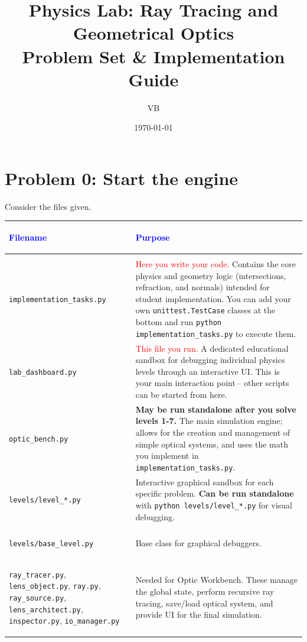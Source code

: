 \documentclass[11pt]{article}
\title{Physics Lab: Ray Tracing and Geometrical Optics \\ \large Problem Set \& Implementation Guide}
\author{VB}
\date{\today}
\begin{document}
\maketitle

\section*{Problem 0: Start the engine}

Consider the files given.
\begin{center}
\renewcommand{\arraystretch}{1.5}
\begin{tabularx}{\textwidth}{@{} >{\bfseries\raggedright\arraybackslash}p{5.5cm} X @{}}
\toprule
\textcolor{blue}{Filename} & \textcolor{blue}{Purpose} \\ \midrule
\multicolumn{2}{@{}l}{\textbf{Direct Interaction}} \\ \midrule
\lstinline|implementation_tasks.py| & \textcolor{red}{Here you write your code.} Contains the core physics and geometry logic (intersections, refraction, and normals) intended for student implementation. You can add your own \lstinline|unittest.TestCase| classes at the bottom and run \lstinline|python implementation_tasks.py| to execute them. \\
\lstinline|lab_dashboard.py| & \textcolor{red}{This file you run.} A dedicated educational sandbox for debugging individual physics levels through an interactive UI. This is your main interaction point\,-- other scripts can be started from here.\\
\lstinline|optic_bench.py| & \textbf{May be run standalone after you solve levels 1-7.} The main simulation engine; allows for the creation and management of simple optical systems, and uses the math you implement in \lstinline|implementation_tasks.py|. \\
\lstinline|levels/level_*.py| & Interactive graphical sandbox for each specific problem. \textbf{Can be run standalone} with \lstinline|python levels/level_*.py| for visual debugging. \\ \midrule
\multicolumn{2}{@{}l}{\textbf{Under the Hood}} \\ \midrule
\lstinline|levels/base_level.py| & Base class for graphical debuggers.\\
\mbox{\lstinline|ray_tracer.py|}, \mbox{\lstinline|lens_object.py|}, \mbox{\lstinline|ray.py|}, \mbox{\lstinline|ray_source.py|}, \mbox{\lstinline|lens_architect.py|}, \mbox{\lstinline|inspector.py|}, \mbox{\lstinline|io_manager.py|} & Needed for Optic Workbench. These manage the global state, perform recursive ray tracing, save/load optical system, and provide UI for the final simulation. \\
\bottomrule
\end{tabularx}
\end{center}
\end{document}
